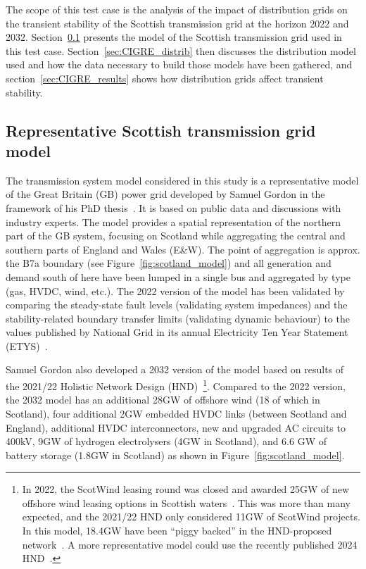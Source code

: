 The scope of this test case is the analysis of the impact of distribution grids on the transient stability of the Scottish transmission grid at the horizon 2022 and 2032. Section~\ref{sec:CIGRE_transmission} presents the model of the Scottish transmission grid used in this test case. Section~\ref{sec:CIGRE_distrib} then discusses the distribution model used and how the data necessary to build those models have been gathered, and section~\ref{sec:CIGRE_results} shows how distribution grids affect transient stability.

\subsection{Representative Scottish transmission grid model}
\label{sec:CIGRE_transmission}

The transmission system model considered in this study is a representative model of the Great Britain (GB) power grid developed by Samuel Gordon in the framework of his PhD thesis~\cite{Sam_thesis}. It is based on public data and discussions with industry experts. The model provides a spatial representation of the northern part of the GB system, focusing on Scotland while aggregating the central and southern parts of England and Wales (E\&W). The point of aggregation is approx. the B7a boundary (see Figure~\ref{fig:scotland_model}) and all generation and demand south of here have been lumped in a single bus and aggregated by type (gas, HVDC, wind, etc.). The 2022 version of the model has been validated by comparing the steady-state fault levels (validating system impedances) and the stability-related boundary transfer limits (validating dynamic behaviour) to the values published by National Grid in its annual Electricity Ten Year Statement (ETYS)~\cite{ETYS}.

Samuel Gordon also developed a 2032 version of the model based on results of the 2021/22 Holistic Network Design (HND)~\cite{HND_2022}\footnote{In 2022, the ScotWind leasing round was closed and awarded 25GW of new offshore wind leasing options in Scottish waters~\cite{scotwind_2022}. This was more than many expected, and the 2021/22 HND only considered 11GW of ScotWind projects. In this model, 18.4GW have been ``piggy backed'' in the HND-proposed network~\cite{HND_2022}. A more representative model could use the recently published 2024 HND~\cite{HND_2024}.}. Compared to the 2022 version, the 2032 model has an additional 28GW of offshore wind (18 of which in Scotland), four additional 2GW embedded HVDC links (between Scotland and England), additional HVDC interconnectors, new and upgraded AC circuits to 400kV, 9GW of hydrogen electrolysers (4GW in Scotland), and 6.6 GW of battery storage (1.8GW in Scotland) as shown in Figure~\ref{fig:scotland_model}.

